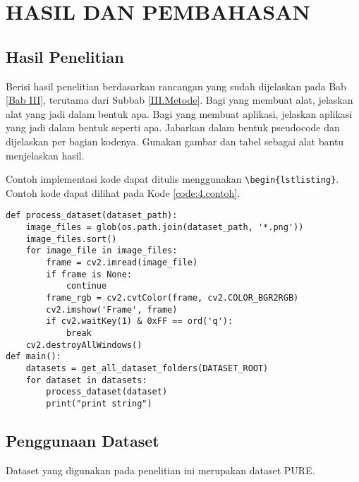 \newpage
\chapter{HASIL DAN PEMBAHASAN} \label{Bab IV}

\section{Hasil Penelitian} \label{IV.Hasil}
Berisi hasil penelitian berdasarkan rancangan yang sudah dijelaskan pada Bab \ref{Bab III}, terutama dari Subbab \ref{III.Metode}. Bagi yang membuat alat, jelaskan alat yang jadi dalam bentuk apa. Bagi yang membuat aplikasi, jelaskan aplikasi yang jadi dalam bentuk seperti apa. Jabarkan dalam bentuk pseudocode dan dijelaskan per bagian kodenya. Gunakan gambar dan tabel sebagai alat bantu menjelaskan hasil. \par

Contoh implementasi kode dapat ditulis menggunakan \verb|\begin{lstlisting}|. Contoh kode dapat dilihat pada Kode \ref{code:4.contoh}. \par
\begin{lstlisting}[caption={Akuisisi Gambar}, label={code:4.contoh}]
def process_dataset(dataset_path):
	image_files = glob(os.path.join(dataset_path, '*.png'))
	image_files.sort()
	for image_file in image_files:
		frame = cv2.imread(image_file)
		if frame is None:
			continue
		frame_rgb = cv2.cvtColor(frame, cv2.COLOR_BGR2RGB)
		cv2.imshow('Frame', frame)
		if cv2.waitKey(1) & 0xFF == ord('q'):
			break
	cv2.destroyAllWindows()
def main():
	datasets = get_all_dataset_folders(DATASET_ROOT)
	for dataset in datasets:
		process_dataset(dataset)
		print("print string")
\end{lstlisting}

\section{Penggunaan Dataset} \label{IV.Penggunaan}
Dataset yang digunakan pada penelitian ini merupakan dataset PURE. 
\lipsum[1-2] %

